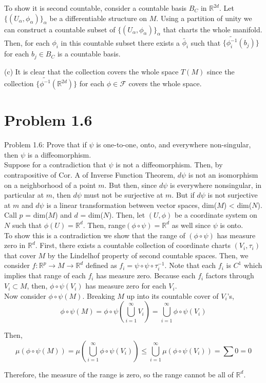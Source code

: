 \documentclass[paper=a4, fontsize=11pt]{scrartcl} %
\numberwithin{equation}{section} %
\numberwithin{figure}{section} %
\numberwithin{table}{section} %
\begin{document}
To show it is second countable, consider a countable basis $B_C$ in $\mathbb{R}^{2d}$. Let $\{ (U_{\alpha}, \phi_{\alpha}) \}_{\alpha}$ be a differentiable structure on $M$. Using a partition of unity we can construct a countable subset of $\{ (U_{\alpha}, \phi_{\alpha}) \}_{\alpha}$ that charts the whole manifold. Then, for each $\phi_i$ in this countable subset there exists a $\tilde{\phi_i}$ such that $\{ \tilde{\phi_i ^{-1}}(b_j) \}$ for each $b_j \in B_C$ is a countable basis.

(c) It is clear that the collection covers the whole space $T(M)$ since the collection $\{\tilde{\phi^{-1}}(\mathbb{R}^{2d}) \} $ for each $\phi \in \mathscr{F}$ covers the whole space.

\section*{Problem 1.6}
Problem 1.6: Prove that if $\psi$ is one-to-one, onto, and everywhere non-singular, then $\psi$ is a diffeomorphism. \\

Suppose for a contradiction that $\psi$ is not a diffeomorphism. Then, by contrapositive of Cor. A of Inverse Function Theorem, $d\psi$ is not an isomorphism on a neighborhood of a point $m$. But then, since $d\psi$ is everywhere nonsingular, in particular at $m$, then $d\psi$ must not be surjective at $m$. But if $d\psi$ is not surjective at $m$ and $d\psi$ is a linear transformation between vector spaces, dim($M$) < dim($N$). Call $p$ = dim($M$) and $d$ = dim($N$). Then, let $(U, \phi)$ be a coordinate system on $N$ such that $\phi(U) = \mathbb{R}^{d}$.  Then, range$(\phi \circ \psi) = \mathbb{R}^{d}$ as well since $\psi$ is onto. \\

To show this is a contradiction we show that the range of $(\phi \circ \psi)$ has measure zero in $\mathbb{R}^{d}$. First, there exists a countable collection of coordinate charts $(V_i, \tau_i)$ that cover $M$ by the Lindelhof property of second countable spaces. Then, we consider $f: \mathbb{R}^{p} \to M \to \mathbb{R}^{d}$ defined as $f_i = \psi \circ \psi \circ \tau_i ^{-1} $. Note that each $f_i$ is $C^1$ which implies that range of each $f_i$ has measure zero. Because each $f_i$ factors through $V_i \subset M$, then, $\phi \circ \psi (V_i)$ has measure zero for each $V_i$. \\

 Now consider $\phi \circ \psi (M)$. Breaking $M$ up into its countable cover of $V_i$'s,
 \[
 \phi \circ \psi (M) = \phi \circ \psi (\bigcup_{i = 1} ^{\infty} V_i) = \bigcup_{i = 1} ^{\infty} \phi \circ \psi (V_i) \]
 
 Then,
 \[ 
 \mu (\phi \circ \psi (M)) = \mu (\bigcup_{i = 1} ^{\infty} \phi \circ \psi (V_i)) \leq  \bigcup_{i = 1} ^{\infty} \mu( \phi \circ \psi (V_i)) = \sum 0 = 0
 \]
 
 Therefore, the measure of the range is zero, so the range cannot be all of $\mathbb{R}^{d}$.




\end{document}

